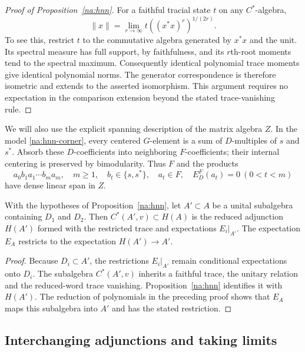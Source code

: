 \begin{proof}[Proof of Proposition~\ref{na:hnn}]
For a faithful tracial state $t$ on any $C^*$-algebra,
\begin{equation}\label{na:moment-norm}
 \|x\|=\lim_{r\to\infty}t((x^*x)^r)^{1/(2r)}.
\end{equation}
To see this, restrict $t$ to the commutative algebra generated by
$x^*x$ and the unit.  Its spectral measure has full support, by
faithfulness, and its $r$th-root moments tend to the spectral maximum.
Consequently identical polynomial trace moments give identical
polynomial norms.  The generator correspondence is therefore
isometric and extends to the asserted isomorphism.  This argument
requires no expectation in the comparison extension beyond the stated
trace-vanishing rule.
\end{proof}

We will also use the explicit spanning description of the matrix
algebra $Z$.  In the model \eqref{na:hnn-corner}, every centered
$G$-element is a sum of $D$-multiples of $s$ and $s^*$.  Absorb these
$D$-coefficients into neighboring $F$-coefficients; their internal
centering is preserved by bimodularity.  Thus $F$ and the products
\begin{equation}\label{na:matrix-word-span}
 a_0b_1a_1\cdots b_ma_m,
 \quad m\geq1,\quad b_t\in\{s,s^*\},\quad a_t\in F,
 \quad E_D^F(a_t)=0\ (0<t<m)
\end{equation}
have dense linear span in $Z$.

\begin{corollary}\label{na:hnn-restriction}
With the hypotheses of Proposition~\ref{na:hnn}, let $A'\subset A$
be a unital subalgebra containing $D_1$ and $D_2$.  Then
$C^*(A',v)\subset H(A)$ is the reduced adjunction $H(A')$ formed with
the restricted trace and expectations $E_i|_{A'}$.  The expectation
$E_A$ restricts to the expectation $H(A')\to A'$.
\end{corollary}

\begin{proof}
Because $D_i\subset A'$, the restrictions $E_i|_{A'}$ remain
conditional expectations onto $D_i$.  The subalgebra $C^*(A',v)$
inherits a faithful trace, the unitary relation and the reduced-word
trace vanishing.  Proposition~\ref{na:hnn} identifies it with $H(A')$.
The reduction of polynomials in the preceding proof shows that $E_A$
maps this subalgebra into $A'$ and has the stated restriction.
\end{proof}

\subsection{Interchanging adjunctions and taking limits}

